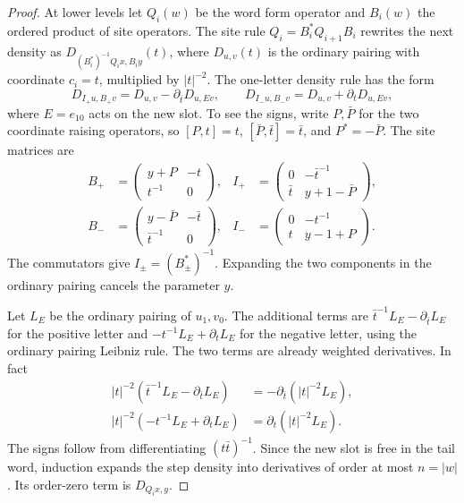 \begin{proof}

At lower levels let \(Q_i(w)\) be the word form operator
and \(B_i(w)\) the ordered product of site operators.
The site rule \(Q_i=B_i^*Q_{i+1}B_i\) rewrites the next
density as \(D_{(B_i^*)^{-1}Q_i x,B_i y}(t)\), where
\(D_{u,v}(t)\) is the ordinary pairing with coordinate
\(c_i=t\), multiplied by \(|t|^{-2}\).
The one-letter density rule has the form
\[
 D_{I_+u,B_+v}=D_{u,v}-\partial_{\bar t}D_{u,Ev},
 \qquad D_{I_-u,B_-v}=D_{u,v}+\partial_t D_{u,Ev},
\]
where \(E=e_{10}\) acts on the new slot. To see the signs,
write \(P,\bar P\) for the two coordinate raising operators,
so \([P,t]=t\), \([\bar P,\bar t]=\bar t\), and
\(P^*=-\bar P\). The site matrices are
\begin{align*}
 B_+&=\begin{pmatrix}y+P&-t\\t^{-1}&0\end{pmatrix},&
 I_+&=\begin{pmatrix}0&-\bar t^{-1}\\\bar t&y+1-\bar P\end{pmatrix},\\
 B_-&=\begin{pmatrix}y-\bar P&-\bar t\\\bar t^{-1}&0\end{pmatrix},&
 I_-&=\begin{pmatrix}0&-t^{-1}\\t&y-1+P\end{pmatrix}.
\end{align*}
The commutators give \(I_\pm=(B_\pm^*)^{-1}\).
Expanding the two components in the ordinary pairing cancels
the parameter \(y\).

Let \(L_E\) be the ordinary pairing of
\(u_1,v_0\). The additional terms are
\(\bar t^{-1}L_E-\partial_{\bar t}L_E\) for the positive
letter and \(-t^{-1}L_E+\partial_t L_E\) for the negative
letter, using the ordinary pairing Leibniz rule.
The two terms are already weighted derivatives. In fact
\[
 \begin{aligned}
 |t|^{-2}(\bar t^{-1}L_E-\partial_{\bar t}L_E)
     &=-\partial_{\bar t}(|t|^{-2}L_E),\\
 |t|^{-2}(-t^{-1}L_E+\partial_tL_E)
     &=\partial_t(|t|^{-2}L_E).
 \end{aligned}
\]
The signs follow from differentiating \((t\bar t)^{-1}\).
Since the new slot is free in the tail word,
induction expands the step density into derivatives of
order at most \(n=|w|\). Its order-zero term is
\(D_{Q_i x,y}\).


\end{proof}
